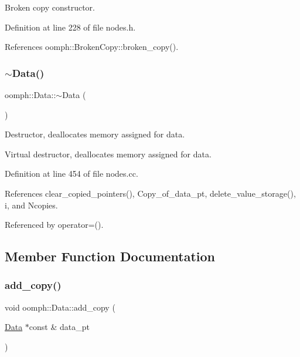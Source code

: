 Broken copy constructor. 



Definition at line 228 of file nodes.\+h.



References oomph\+::\+Broken\+Copy\+::broken\+\_\+copy().

\mbox{\label{classoomph_1_1Data_a91d15d22184e0488123d856ea4c455f8}} 
\subsubsection{\texorpdfstring{$\sim$\+Data()}{~Data()}}
{\footnotesize\ttfamily oomph\+::\+Data\+::$\sim$\+Data (\begin{DoxyParamCaption}{ }\end{DoxyParamCaption})\hspace{0.3cm}{\ttfamily [virtual]}}



Destructor, deallocates memory assigned for data. 

Virtual destructor, deallocates memory assigned for data. 

Definition at line 454 of file nodes.\+cc.



References clear\+\_\+copied\+\_\+pointers(), Copy\+\_\+of\+\_\+data\+\_\+pt, delete\+\_\+value\+\_\+storage(), i, and Ncopies.



Referenced by operator=().



\subsection{Member Function Documentation}
\mbox{\label{classoomph_1_1Data_a12041550d37ff348ce82c85076fe36ba}} 
\subsubsection{\texorpdfstring{add\+\_\+copy()}{add\_copy()}}
{\footnotesize\ttfamily void oomph\+::\+Data\+::add\+\_\+copy (\begin{DoxyParamCaption}\item[{\hyperlink{classoomph_1_1Data}{Data} $\ast$const \&}]{data\+\_\+pt }\end{DoxyParamCaption})\hspace{0.3cm}{\ttfamily [private]}}



